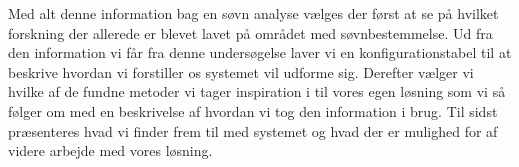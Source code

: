 Med alt denne information bag en søvn analyse vælges der først at se på hvilket forskning der allerede er blevet lavet på området med søvnbestemmelse.
Ud fra den information vi får fra denne undersøgelse laver vi en konfigurationstabel til at beskrive hvordan vi forstiller os systemet vil udforme sig.
Derefter vælger vi hvilke af de fundne metoder vi tager inspiration i til vores egen løsning som vi så følger om med en beskrivelse af hvordan vi tog den information i brug.
Til sidst præsenteres hvad vi finder frem til med systemet og hvad der er mulighed for af videre arbejde med vores løsning. 